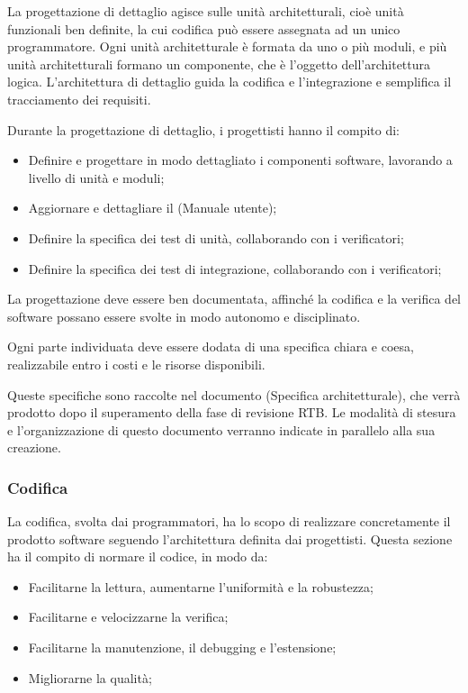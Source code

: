 \documentclass[10pt, a4paper]{article}
\begin{document}
La progettazione di dettaglio agisce sulle unità architetturali, cioè unità funzionali ben definite, la cui codifica può essere assegnata ad un unico programmatore.
Ogni unità architetturale è formata da uno o più moduli, e più unità architetturali formano un componente, che è l'oggetto dell'architettura logica.
L'architettura di dettaglio guida la codifica e l'integrazione e semplifica il tracciamento dei requisiti.

Durante la progettazione di dettaglio, i progettisti hanno il compito di:
\begin{itemize}
    \item Definire e progettare in modo dettagliato i componenti software, lavorando a livello di unità e moduli;
    \item Aggiornare e dettagliare il (Manuale utente);
    \item Definire la specifica dei test di unità, collaborando con i verificatori;
    \item Definire la specifica dei test di integrazione, collaborando con i verificatori;
\end{itemize}

La progettazione deve essere ben documentata, affinché la codifica e la verifica del software possano essere svolte in modo autonomo e disciplinato.

Ogni parte individuata deve essere dodata di una specifica chiara e coesa, realizzabile entro i costi e le risorse disponibili.

Queste specifiche sono raccolte nel documento (Specifica architetturale), che verrà prodotto dopo il superamento della fase di revisione RTB.
Le modalità di stesura e l'organizzazione di questo documento verranno indicate in parallelo alla sua creazione.

\subsubsection{Codifica}
La codifica, svolta dai programmatori, ha lo scopo di realizzare concretamente il prodotto software seguendo l'architettura definita dai progettisti.
Questa sezione ha il compito di normare il codice, in modo da:
\begin{itemize}
    \item Facilitarne la lettura, aumentarne l'uniformità e la robustezza;
    \item Facilitarne e velocizzarne la verifica;
    \item Facilitarne la manutenzione, il debugging e l'estensione;
    \item Migliorarne la qualità;
\end{itemize}
\end{document}

